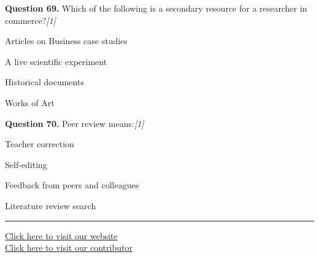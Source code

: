 \documentclass[11pt,a4paper]{article}
\newcommand{\pts}[1]{\hfill   \textit{[#1]}}
\begin{document}
\medskip




\noindent   \textbf{Question 69.} Which of the following is a secondary resource for a researcher in commerce?\pts{1}

\begin{parts}
  \item Articles on Business case studies
  \item A live scientific experiment
  \item Historical documents
  \item Works of Art
\end{parts}

\medskip




\noindent   \textbf{Question 70.} Peer review means:\pts{1}

\begin{parts}
  \item Teacher correction
  \item Self-editing
  \item Feedback from peers and colleagues
  \item Literature review search
\end{parts}

\vfill
\rule{\linewidth}{0.4pt}

\begin{center}\small
\href{https://bhu-exam.vercel.app/}{Click here to visit our website}\\[4pt]
\href{https://me-aryan.vercel.app/}{Click here to visit our contributor}
\end{center}
\end{document}
